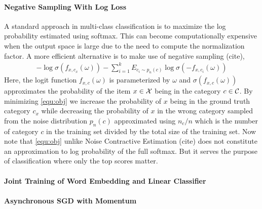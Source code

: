 \paragraph{Negative Sampling With Log Loss}
A standard approach in multi-class classification is to maximize the log probability estimated using softmax. This can become computationally expensive when the output space is large due to the need to compute the normalization factor. A more efficient alternative is to make use of negative sampling (cite),
\begin{align}
\label{equ:obj}
    - \log \sigma(f_{x, c_x}(\omega)) 
    - \sum_{i=1}^k E_{c_i \sim p_n(c)} \log \sigma(-f_{x, c_i}(\omega))
\end{align}
Here, the logit function $f_{x, c}(\omega)$ is parameterized by $\omega$ and $\sigma(f_{x, c}(\omega))$ approximates the probability of the item $x \in \mathcal{X}$ being in the category $c \in \mathcal{C}$. By minimizing \eqref{equ:obj} we increase the probability of $x$ being in the ground truth category $c_x$ while decreasing the probability of $x$ in the wrong category sampled from the noise distribution $p_n(c)$ approximated using $n_c / n$ which is the number of category $c$ in the training set divided by the total size of the training set. Now note that \eqref{equ:obj} unlike Noise Contractive Estimation (cite) does not constitute an approximation to log probability of the full softmax. But it serves the purpose of classification where only the top scores matter.

\paragraph{Joint Training of Word Embedding and Linear Classifier}
\paragraph{Asynchronous SGD with Momentum}



